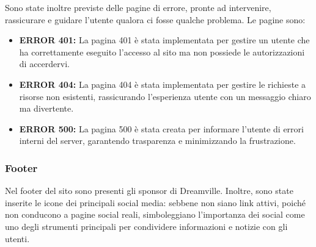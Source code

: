 Sono state inoltre previste delle pagine di errore, pronte ad intervenire, rassicurare e guidare l'utente qualora ci fosse qualche problema.
Le pagine sono:
\begin{itemize}
    \item \textbf{ERROR 401:} La pagina 401 è stata implementata per gestire un utente che ha correttamente eseguito l'accesso al sito ma non possiede le autorizzazioni di accerdervi.
    \item \textbf{ERROR 404:} La pagina 404 è stata implementata per gestire le richieste a risorse non esistenti, rassicurando l'esperienza utente con un messaggio chiaro ma divertente.
    \item \textbf{ERROR 500:} La pagina 500 è stata creata per informare l'utente di errori interni del server, garantendo trasparenza e minimizzando la frustrazione.
\end{itemize}
\subsubsection{Footer}
Nel footer del sito sono presenti gli sponsor di Dreamville. Inoltre, sono state inserite le icone dei principali social media: sebbene non siano link attivi, poiché non conducono a pagine social reali, simboleggiano l'importanza dei social come uno degli strumenti principali per condividere informazioni e notizie con gli utenti.

